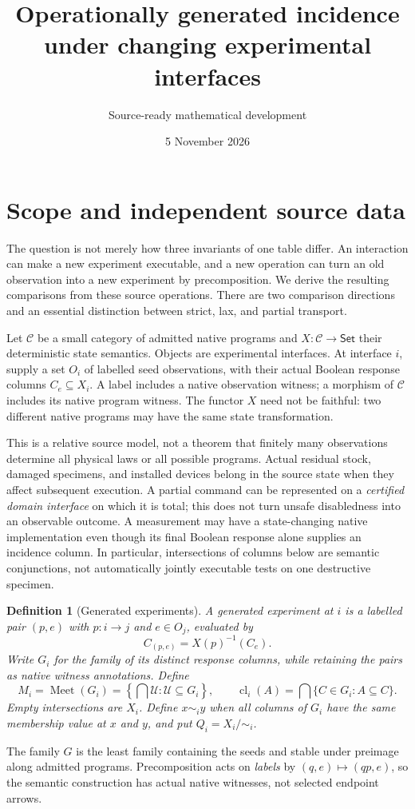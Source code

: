 \documentclass[11pt]{article}
\title{Operationally generated incidence under changing experimental interfaces}
\author{Source-ready mathematical development}
\date{5 November 2026}
\newtheorem{definition}[theorem]{Definition}
\theoremstyle{remark}\newtheorem{remark}[theorem]{Remark}
\newcommand{\Meet}{\operatorname{Meet}}
\newcommand{\cl}{\operatorname{cl}}
\begin{document}
\maketitle

\section{Scope and independent source data}
The question is not merely how three invariants of one table differ.
An interaction can make a new experiment executable, and a new operation
can turn an old observation into a new experiment by precomposition.
We derive the resulting comparisons from these source operations. There
are two comparison directions and an essential distinction between
strict, lax, and partial transport.

Let $\mathcal C$ be a small category of admitted native programs and
$X:\mathcal C\to\mathsf{Set}$ their deterministic state semantics.
Objects are experimental interfaces. At interface $i$, supply a set
$O_i$ of labelled seed observations, with their actual Boolean response
columns $C_e\subseteq X_i$. A label includes a native observation
witness; a morphism of $\mathcal C$ includes its native program witness.
The functor $X$ need not be faithful: two different native programs may
have the same state transformation.

This is a relative source model, not a theorem that finitely many
observations determine all physical laws or all possible programs.
Actual residual stock, damaged specimens, and installed devices belong
in the source state when they affect subsequent execution. A partial
command can be represented on a \emph{certified domain interface} on
which it is total; this does not turn unsafe disabledness into an
observable outcome. A measurement may have a state-changing native
implementation even though its final Boolean response alone supplies
an incidence column. In particular, intersections of columns below are
semantic conjunctions, not automatically jointly executable tests on
one destructive specimen.

\begin{definition}[Generated experiments]
A generated experiment at $i$ is a labelled pair $(p,e)$ with
$p:i\to j$ and $e\in O_j$, evaluated by
\[
 C_{(p,e)}=X(p)^{-1}(C_e).
\]
Write $G_i$ for the family of its distinct response columns, while
retaining the pairs as native witness annotations. Define
\[
 M_i=\Meet(G_i)
 =\left\{\bigcap\mathcal U:\mathcal U\subseteq G_i\right\},
 \qquad
 \cl_i(A)=\bigcap\{C\in G_i:A\subseteq C\}.
\]
Empty intersections are $X_i$. Define $x\sim_i y$ when all columns of
$G_i$ have the same membership value at $x$ and $y$, and put
$Q_i=X_i/{\sim_i}$.
\end{definition}
The family $G$ is the least family containing the seeds and stable
under preimage along admitted programs. Precomposition acts on
\emph{labels} by $(q,e)\mapsto(qp,e)$, so the semantic construction has
actual native witnesses, not selected endpoint arrows.
\end{document}

